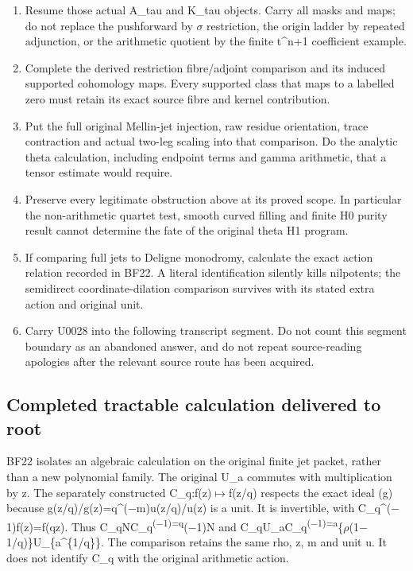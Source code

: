 \documentclass[10pt,a4paper,oneside]{report}
\providecommand{\tightlist}{\setlength{\itemsep}{0pt}\setlength{\parskip}{0pt}}
\begin{document}
\begin{enumerate}
\def\labelenumi{\arabic{enumi}.}
\tightlist
\item
  Resume those actual A\_tau and K\_tau objects. Carry all masks and
  maps; do not replace the pushforward by
  \allowbreak{}\ensuremath{σ}\allowbreak{} restriction, the origin
  ladder by repeated adjunction, or the arithmetic quotient by the
  finite t\^{}n+1 coefficient example.
\item
  Complete the derived restriction fibre/adjoint comparison and its
  induced supported cohomology maps. Every supported class that maps to
  a labelled zero must retain its exact source fibre and kernel
  contribution.
\item
  Put the full original Mellin-jet injection, raw residue orientation,
  trace contraction and actual two-leg scaling into that comparison. Do
  the analytic theta calculation, including endpoint terms and gamma
  arithmetic, that a tensor estimate would require.
\item
  Preserve every legitimate obstruction above at its proved scope. In
  particular the non-arithmetic quartet test, smooth curved filling and
  finite H0 purity result cannot determine the fate of the original
  theta H1 program.
\item
  If comparing full jets to Deligne monodromy, calculate the exact
  action relation recorded in BF22. A literal identification silently
  kills nilpotents; the semidirect coordinate-dilation comparison
  survives with its stated extra action and original unit.
\item
  Carry U0028 into the following transcript segment. Do not count this
  segment boundary as an abandoned answer, and do not repeat
  source-reading apologies after the relevant source route has been
  acquired.
\end{enumerate}

\subsection{Completed tractable calculation delivered to
root}\label{completed-tractable-calculation-delivered-to-root}

BF22 isolates an algebraic calculation on the original finite jet
packet, rather than a new polynomial family. The original U\_a commutes
with multiplication by z. The separately constructed
C\_q:f(z)\allowbreak{}\ensuremath{↦}\allowbreak{}f(z/q) respects the
exact ideal (g) because
g(z/q)/g(z)=q\textasciicircum{}(\allowbreak{}\ensuremath{−}\allowbreak{}m)u(z/q)/u(z)
is a unit. It is invertible, with
C\_q\textasciicircum{}(\allowbreak{}\ensuremath{−}\allowbreak{}1)f(z)=f(qz).
Thus
C\_qNC\_q\textsuperscript{(\allowbreak{}\ensuremath{−}\allowbreak{}1)=q}(\allowbreak{}\ensuremath{−}\allowbreak{}1)N
and
C\_qU\_aC\_q\textsuperscript{(\allowbreak{}\ensuremath{−}\allowbreak{}1)=a}\{\allowbreak{}\ensuremath{ρ}\allowbreak{}(1\allowbreak{}\ensuremath{−}\allowbreak{}1/q)\}U\_\{a\textasciicircum{}\{1/q\}\}.
The comparison retains the same rho, z, m and unit u. It does not
identify C\_q with the original arithmetic action.
\end{document}
